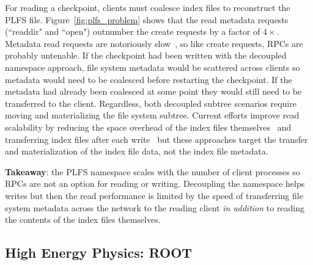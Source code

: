 For reading a checkpoint, clients must coalesce index files to reconstruct the
PLFS file. Figure~\ref{fig:plfs_problem} shows that the read metadata requests
(``readdir" and ``open") outnumber the create requests by a factor of
\(4\times\). Metadata read requests are notoriously
slow~\cite{carns:ipdps09-pvfs, eshel:fast10-panache}, so like create requests,
RPCs are probably untenable. If the checkpoint had been written with the
decoupled namespace approach, file system metadata would be scattered across
clients so metadata would need to be coalesced before restarting the
checkpoint. If the metadata had already been coalesced at some point they would
still need to be transferred to the client. Regardless, both decoupled
subtree scenarios require moving and materializing the file system subtree.
Current efforts improve read scalability by reducing the space overhead of the
index files themselves~\cite{he:hpdc13-plfs-patterns} and transferring index
files after each write~\cite{grider:pc17-diddlings} but these approaches target
the transfer and materialization of the index file data, not the index file
metadata.

\textbf{Takeaway}: the PLFS namespace scales with the number of client
processes so RPCs are not an option for reading or writing.  Decoupling the
namespace helps writes but then the read performance is limited by the speed of
transferring file system metadata across the network to the reading client {\it
in addition} to reading the contents of the index files themselves.

\vspace{-0.75em}
\subsection{High Energy Physics: ROOT}
\label{sec:hep}
\vspace{-0.75em}


